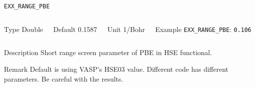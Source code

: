 \begin{frame}[allowframebreaks]{\texttt{EXX\_RANGE\_PBE}} \label{EXX_RANGE_PBE}
\vspace*{-12pt}
\begin{columns}
\begin{block}{Type}
Double
\end{block}

\begin{block}{Default}
0.1587
\end{block}

\begin{block}{Unit}
1/Bohr
\end{block}

\begin{block}{Example}
\texttt{EXX\_RANGE\_PBE}: \texttt{0.106}
\end{block}
\end{columns}

\begin{block}{Description}
Short range screen parameter of PBE in HSE functional. 
\end{block}

\begin{block}{Remark}
Default is using VASP's HSE03 value. Different code has different parameters. Be careful with the results. 
\end{block}

\end{frame}

